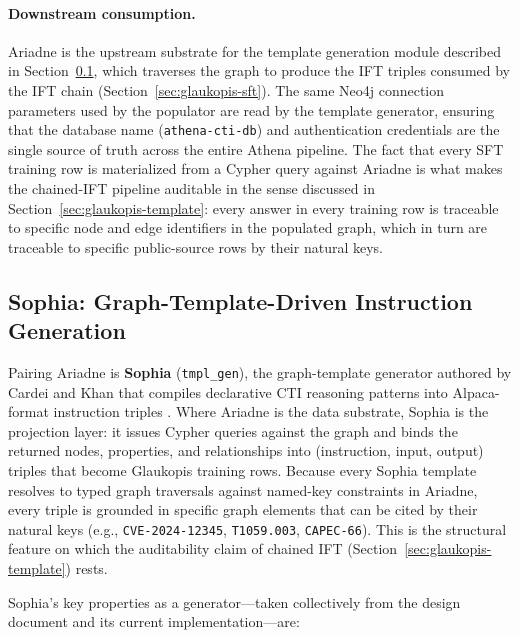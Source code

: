 \documentclass[webpdf,contemporary,large]{oup-authoring-template}
\theoremstyle{thmstyleone}
\theoremstyle{thmstyletwo}
\theoremstyle{thmstylethree}
\begin{document}
\paragraph{Downstream consumption.}
Ariadne is the upstream substrate for the template generation module described in Section~\ref{sec:ariadne-templates}, which traverses the graph to produce the IFT triples consumed by the IFT chain (Section~\ref{sec:glaukopis-sft}). The same Neo4j connection parameters used by the populator are read by the template generator, ensuring that the database name (\texttt{athena-cti-db}) and authentication credentials are the single source of truth across the entire Athena pipeline. The fact that every SFT training row is materialized from a Cypher query against Ariadne is what makes the chained-IFT pipeline auditable in the sense discussed in Section~\ref{sec:glaukopis-template}: every answer in every training row is traceable to specific node and edge identifiers in the populated graph, which in turn are traceable to specific public-source rows by their natural keys.

\subsection{Sophia: Graph-Template-Driven Instruction Generation}
\label{sec:ariadne-templates}

Pairing Ariadne is \textbf{Sophia} (\texttt{tmpl\_gen}), the graph-template generator authored by Cardei and Khan that compiles declarative CTI reasoning patterns into Alpaca-format instruction triples \cite{cardei2025ift}. Where Ariadne is the data substrate, Sophia is the projection layer: it issues Cypher queries against the graph and binds the returned nodes, properties, and relationships into (instruction, input, output) triples that become Glaukopis training rows. Because every Sophia template resolves to typed graph traversals against named-key constraints in Ariadne, every triple is grounded in specific graph elements that can be cited by their natural keys (e.g., \texttt{CVE-2024-12345}, \texttt{T1059.003}, \texttt{CAPEC-66}). This is the structural feature on which the auditability claim of chained IFT (Section~\ref{sec:glaukopis-template}) rests.

Sophia's key properties as a generator---taken collectively from the design document and its current implementation---are:
\end{document}
